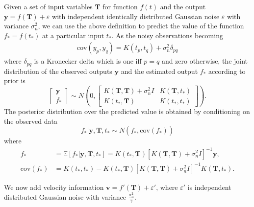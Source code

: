 Given a set of input variables $\mathbf{T}$ for function $f(t)$ and the output $\mathbf{y}=f(\mathbf{T})+\varepsilon$ with independent identically distributed Gaussian noise $\varepsilon$ with variance $\sigma_n^2$,  we can use the above definition to predict the value of the function $f_*=f(t_*)$ at a particular input $t_*$. As the noisy observations becoming
\begin{align}\label{covdef}
\text{cov}(y_p,y_q) = K(t_p,t_q)+\sigma_n^2 \delta_{pq}
\end{align}
where $\delta_{pq}$ is a Kronecker delta which is one iff $p=q$ and zero otherwise, the joint distribution of the observed outputs $\mathbf{y}$ and the estimated output $f_*$ according to prior is
\begin{equation}
\left[ \begin{matrix}
\mathbf{y}\\
f_*
\end{matrix} \right] \sim N \left(  
0,\left[   \begin{matrix}
K(\mathbf{T},\mathbf{T}) +\sigma_n^2I& K(\mathbf{T},t_*) \\
K(t_*,\mathbf{T}) & K(t_*,t_*)
\end{matrix}  \right] 
\right).
\end{equation}
The posterior distribution over the predicted value is obtained by conditioning on the observed data
\begin{equation}
f_* | \mathbf{y},\mathbf{T},t_* \sim N(\bar{f_*},\text{cov}(f_*))
\end{equation}
where 
\begin{align}
\bar{f_*}&=\mathbb{E}[f_* | \mathbf{y},\mathbf{T},t_* ]=K(t_*,\mathbf{T})[K(\mathbf{T},\mathbf{T})+\sigma_n^2I]^{-1}\mathbf{y},\\
\text{cov}(f_*)&=K(t_*,t_*)-K(t_*,\mathbf{T})[K(\mathbf{T},\mathbf{T})+\sigma_n^2I]^{-1}K(\mathbf{T},t_*).
\end{align}

We now add velocity information $\mathbf{v}=f'(\mathbf{T})+\varepsilon'$, where $\varepsilon'$ is independent distributed Gaussian noise with variance $\frac{\sigma_n^2}{\gamma}$.

